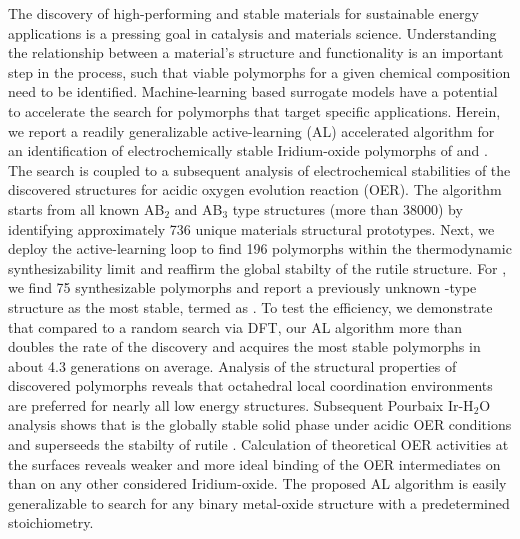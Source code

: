 %


%
The discovery of high-performing and stable materials for sustainable energy applications is a pressing goal in catalysis and materials science. Understanding the relationship between a material's structure and functionality is an important step in the process, such that viable polymorphs for a given chemical composition need to be identified.
%
Machine-learning based surrogate models have a potential to accelerate the search for polymorphs that target specific applications.
Herein, we report a readily generalizable active-learning (AL) accelerated algorithm for an identification of electrochemically stable Iridium-oxide polymorphs of \IrOtwo and \IrOthree. The search is coupled to a subsequent analysis of electrochemical stabilities of the discovered structures for acidic oxygen evolution reaction (OER).
The algorithm starts from all known AB$_2$ and AB$_3$ type structures (more than 38000) by identifying approximately 736 unique materials structural prototypes. Next, we deploy the active-learning loop to  find \num{196} \IrOtwo polymorphs within the thermodynamic synthesizability limit and reaffirm the global stabilty of the rutile structure. For \IrOthree, we find \num{75} synthesizable polymorphs and report a previously unknown -type structure as the most stable, termed as \aIrOthree. To test the efficiency, we  demonstrate that compared to a random search via DFT, our AL algorithm more than doubles the rate of the discovery and acquires the most stable polymorphs in about \num{4.3} generations on average. %
Analysis of the structural properties of discovered polymorphs reveals that octahedral local coordination environments are preferred for nearly all low energy structures. Subsequent Pourbaix Ir-H$_2$O analysis shows that \aIrOthree is the globally stable solid phase under acidic OER conditions and superseeds the stabilty of rutile \IrOtwo. 
Calculation of theoretical OER activities at the surfaces reveals 
weaker and more ideal binding of the OER intermediates on \aIrOthree than on any other considered Iridium-oxide. The proposed AL algorithm  is easily generalizable to search for any binary metal-oxide structure with a predetermined stoichiometry.  





